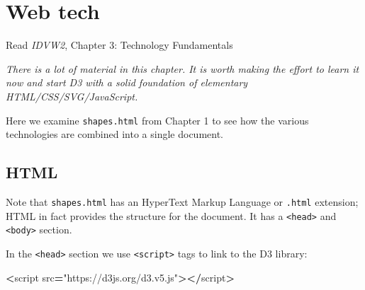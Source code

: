 \documentclass[
  openany]{book}
\newenvironment{Shaded}{\begin{snugshade}}{\end{snugshade}}
\newcommand{\FunctionTok}[1]{\textcolor[rgb]{0.00,0.00,0.00}{#1}}
\newcommand{\KeywordTok}[1]{\textcolor[rgb]{0.13,0.29,0.53}{\textbf{#1}}}
\newcommand{\NormalTok}[1]{#1}
\newcommand{\OperatorTok}[1]{\textcolor[rgb]{0.81,0.36,0.00}{\textbf{#1}}}
\newcommand{\SpecialCharTok}[1]{\textcolor[rgb]{0.00,0.00,0.00}{#1}}
\newcommand{\StringTok}[1]{\textcolor[rgb]{0.31,0.60,0.02}{#1}}
\newcommand{\VerbatimStringTok}[1]{\textcolor[rgb]{0.31,0.60,0.02}{#1}}
\begin{document}
\begin{enumerate}
\begin{Shaded}
\end{Shaded}
\end{enumerate}

\hypertarget{web}{%
\chapter{\texorpdfstring{Web tech }{Web tech }}\label{web}}

Read \emph{IDVW2}, Chapter 3: Technology Fundamentals

\emph{There is a lot of material in this chapter. It is worth making the effort to learn it now and start D3 with a solid foundation of elementary HTML/CSS/SVG/JavaScript.}

Here we examine \texttt{shapes.html} from Chapter 1 to see how the various technologies are combined into a single document.

\hypertarget{html}{%
\section{\texorpdfstring{HTML }{HTML }}\label{html}}

Note that \texttt{shapes.html} has an HyperText Markup Language or \texttt{.html} extension; HTML in fact provides the structure for the document. It has a \texttt{\textless{}head\textgreater{}} and \texttt{\textless{}body\textgreater{}} section.

In the \texttt{\textless{}head\textgreater{}} section we use \texttt{\textless{}script\textgreater{}} tags to link to the D3 library:

\begin{Shaded}
\begin{Highlighting}[]
\OperatorTok{\textless{}}\NormalTok{script src}\OperatorTok{=}\StringTok{"https://d3js.org/d3.v5.js"}\OperatorTok{\textgreater{}\textless{}/}\NormalTok{script}\OperatorTok{\textgreater{}}
\end{Highlighting}
\end{Shaded}
\end{document}
